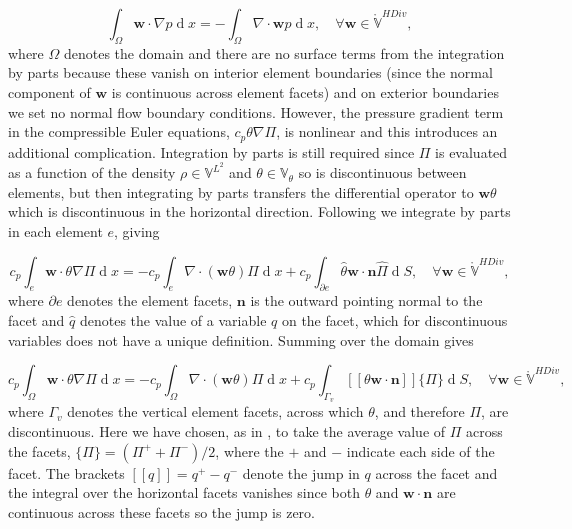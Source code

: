 \documentclass[journal abbreviation, manuscript]{copernicus}
\def\MM#1{\boldsymbol{#1}}
\DeclareMathOperator{\diff}{d}
\newcommand{\avg}[1]{\{#1\}}
\newcommand{\jump}[1]{[\![#1]\!]}
\begin{document}
\begin{equation}
\int_\Omega\MM{w}\cdot\nabla p \diff x = -\int_\Omega\nabla\cdot\MM{w}p\diff x, \quad \forall \MM{w} \in \ring{\mathbb{V}}^{HDiv},
\end{equation}
where $\Omega$ denotes the domain and there are no surface terms from
the integration by parts because these vanish on interior element
boundaries (since the normal component of $\MM{w}$ is continuous
across element facets) and on exterior boundaries we set no normal
flow boundary conditions. However, the pressure gradient term in the
compressible Euler equations, $c_p\theta\nabla\Pi$, is nonlinear and
this introduces an additional complication. Integration by parts is
still required since $\Pi$ is evaluated as a function of the density
$\rho \in \mathbb{V}^{L^2}$ and $\theta \in \mathbb{V}_\theta$ so is
discontinuous between elements, but then integrating by parts
transfers the differential operator to $\MM{w}\theta$ which is
discontinuous in the horizontal direction. Following
\citet{natale2016compatible} we integrate by parts in each element
$e$, giving

\begin{equation}
  c_p\int_e\MM{w}\cdot\theta\nabla\Pi\diff x = -c_p\int_e\nabla\cdot(\MM{w}\theta)\Pi\diff x + c_p\int_{\partial e}\hat{\theta}\MM{w}\cdot\MM{n}\hat{\Pi}\diff S, \quad \forall \MM{w} \in \ring{\mathbb{V}}^{HDiv},
\end{equation}
where $\partial e$ denotes the element facets, $\MM{n}$ is the outward
pointing normal to the facet and $\hat{q}$ denotes the value of a
variable $q$ on the facet, which for discontinuous variables does not
have a unique definition. Summing over the domain gives

\begin{equation}
  c_p\int_\Omega\MM{w}\cdot\theta\nabla\Pi\diff x = -c_p\int_\Omega\nabla\cdot(\MM{w}\theta)\Pi\diff x + c_p\int_{\Gamma_v}\jump{\theta\MM{w}\cdot\MM{n}}\avg{\Pi} \diff S, \quad \forall \MM{w} \in \ring{\mathbb{V}}^{HDiv},
\end{equation}
where $\Gamma_v$ denotes the vertical element facets, across which
$\theta$, and therefore $\Pi$, are discontinuous. Here we have chosen,
as in \citet{natale2016compatible}, to take the average value of $\Pi$
across the facets, $\avg{\Pi} = (\Pi^++\Pi^-)/2$, where the $+$ and
$-$ indicate each side of the facet. The brackets $\jump{q} = q^+-q^-$
denote the jump in $q$ across the facet and the integral over the
horizontal facets vanishes since both $\theta$ and $\MM{w}\cdot\MM{n}$
are continuous across these facets so the jump is zero.
\end{document}
